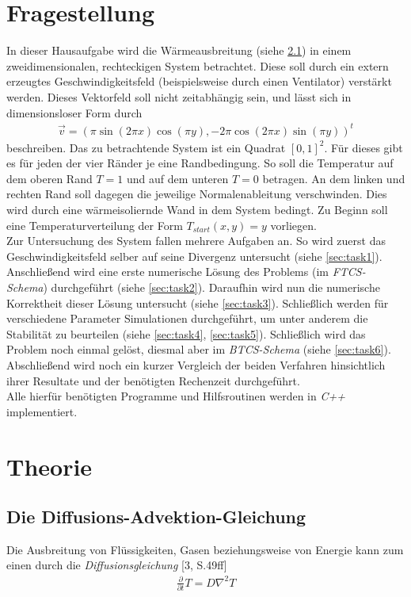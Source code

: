 \documentclass[12pt,a4paper,titlepage,headinclude,bibtotoc]{scrartcl}
\begin{document}
\section{Fragestellung}
\label{sec:fragestellung}
In dieser Hausaufgabe wird die Wärmeausbreitung (siehe \ref{sec:diff_adv}) in einem zweidimensionalen, rechteckigen System betrachtet. Diese soll durch ein extern erzeugtes Geschwindigkeitsfeld (beispielsweise durch einen Ventilator) verstärkt werden. Dieses Vektorfeld soll nicht zeitabhängig sein, und lässt sich in dimensionsloser Form durch
\begin{align*}
\vec{v} = (\pi \sin(2\pi x) \cos(\pi y), -2 \pi \cos(2\pi x) \sin(\pi y))^t
\end{align*}
beschreiben. Das zu betrachtende System ist ein Quadrat $[0,1]^2$. Für dieses gibt es für jeden der vier Ränder je eine Randbedingung. So soll die Temperatur auf dem oberen Rand $T=1$ und auf dem unteren $T=0$ betragen. An dem linken und rechten Rand soll dagegen die jeweilige Normalenableitung verschwinden. Dies wird durch eine wärmeisoliernde Wand in dem System bedingt. Zu Beginn soll eine Temperaturverteilung der Form $T_{start}(x, y) = y$ vorliegen.\\

Zur Untersuchung des System fallen mehrere Aufgaben an. So wird zuerst das Geschwindigkeitsfeld selber auf seine Divergenz untersucht (siehe \ref{sec:task1}). Anschließend wird eine erste numerische Lösung des Problems (im \textit{FTCS-Schema}) durchgeführt (siehe \ref{sec:task2}). Daraufhin wird nun die numerische Korrektheit dieser Lösung untersucht (siehe \ref{sec:task3}). Schließlich werden für verschiedene Parameter Simulationen durchgeführt, um unter anderem die Stabilität zu beurteilen (siehe \ref{sec:task4}, \ref{sec:task5}). Schließlich wird das Problem noch einmal gelöst, diesmal aber im \textit{BTCS-Schema} (siehe \ref{sec:task6}).\\
Abschließend wird noch ein kurzer Vergleich der beiden Verfahren hinsichtlich ihrer Resultate und der benötigten Rechenzeit durchgeführt.\\
Alle hierfür benötigten Programme und Hilfsroutinen werden in \textit{C++} implementiert.

\section{Theorie}
\label{sec:theorie}
\subsection{Die Diffusions-Advektion-Gleichung}
\label{sec:diff_adv}
Die Ausbreitung von Flüssigkeiten, Gasen beziehungsweise von Energie kann zum einen durch die \textit{Diffusionsgleichung} [3, S.49ff]
\begin{align}
\label{eq:diff}
\frac{\partial}{\partial t}T = D \nabla^2 T 
\end{align}
\end{document}
